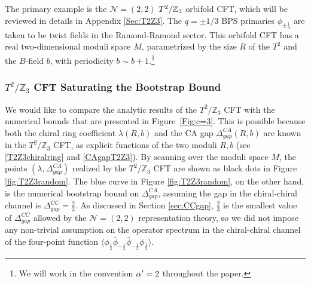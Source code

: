 \documentclass[12pt]{article}
\begin{document}
 The primary example is the $\mathcal{N}=(2,2)$ $T^2 / \mathbb{Z}_3$ orbifold CFT, which will be reviewed in details in Appendix \ref{Sec:T2Z3}.  The $q=\pm1/3$ BPS primaries $\phi_{\pm\frac13}$ are taken to be twist fields in the Ramond-Ramond sector.  This orbifold CFT has a real two-dimensional moduli space $M$, parametrized by the size  $R$ of the $T^2$ and the $B$-field $b$, with periodicity $b\sim b+1$.\footnote{We will work in the convention ${\alpha}'=2$ throughout the paper.}
 
 
 
 \subsubsection{$T^2/\mathbb{Z}_3$ CFT Saturating the Bootstrap Bound}
 
  We would like to compare the analytic results of the $T^2/\mathbb{Z}_3$ CFT with the numerical bounds that are presented in Figure~\ref{Fig:c=3}.  This is possible because both the chiral ring coefficient $\lambda(R,b)$ and the CA gap $\Delta^{CA}_{gap}(R,b)$ are known in the $T^2/\mathbb{Z}_3$ CFT, as explicit functions of the two moduli $R,b$ (see  \eqref{T2Z3chiralring} and \eqref{CAgapT2Z3}).   By scanning over the moduli space $M$,  the points $(\lambda,\Delta^{CA}_{gap})$ realized by the $T^2/\mathbb{Z}_3$ CFT are shown as black dots in Figure \ref{fig:T2Z3random}.  The blue curve in Figure \ref{fig:T2Z3random}, on the other hand, is the numerical bootstrap bound on $\Delta^{CA}_{gap}$, assuming the gap in the chiral-chiral channel is $\Delta^{CC}_{gap}=\frac23$.  As discussed in Section \ref{sec:CCgap},  $\frac23$ is the smallest value of $\Delta^{CC}_{gap}$ allowed by the $\mathcal{N}=(2,2)$ representation theory, so we did not impose any non-trivial assumption on the operator spectrum in the chiral-chiral channel of the four-point function $\langle \phi_{\frac13} \bar \phi_{-\frac13} \bar \phi_{-\frac13} \phi_{\frac13}\rangle$.
\end{document}
